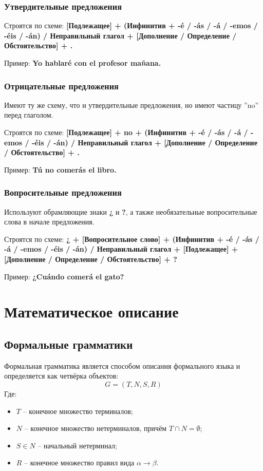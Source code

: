 \documentclass[a4paper,final]{article}
\begin{document}
\subsubsection{Утвердительные предложения}
Строятся по схеме: \textbf{[Подлежащее] + (Инфинитив + -é / -ás / -á / -emos / -éis / -án) / Неправильный глагол + [Дополнение / Определение / Обстоятельство] + .}

Пример: \textbf{Yo hablaré con el profesor mañana.}

\subsubsection{Отрицательные предложения}
Имеют ту же схему, что и утвердительные предложения, но имеют частицу ''no'' перед глаголом.

Строятся по схеме: \textbf{[Подлежащее] + no + (Инфинитив + -é / -ás / -á / -emos / -éis / -án) / Неправильный глагол + [Дополнение / Определение / Обстоятельство] + .}

Пример: \textbf{Tú no comerás el libro.}

\subsubsection{Вопросительные предложения}
Используют обрамляющие знаки \textbf{¿} и \textbf{?}, а также необязательные вопросительные слова в начале предложения.

Строятся по схеме: \textbf{¿ + [Вопросительное слово] + (Инфинитив + -é / -ás / -á / -emos / -éis / -án) / Неправильный глагол + [Подлежащее] + [Дополнение / Определение / Обстоятельство] + ?}

Пример: \textbf{¿Cuándo comerá el gato?}

\newpage
\section{Математическое описание}
\subsection{Формальные грамматики}
Формальная грамматика является способом описания формального языка и определяется как четвёрка объектов: 
$$G = (T, N, S, R)$$
Где:
\begin{itemize}
    \item $T$ -- конечное множество терминалов;
    \item $N$ -- конечное множество нетерминалов, причём $T \cap N = \emptyset$;
    \item $S \in N$ -- начальный нетерминал;
    \item $R$ -- конечное множество правил вида $\alpha \rightarrow \beta$.
\end{itemize}
\end{document}
